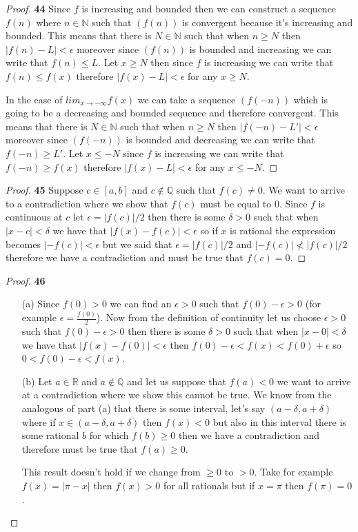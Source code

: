 \documentclass[11pt]{article}
\newcommand{\N}{\mathbb{N}}
\newcommand{\Q}{\mathbb{Q}}
\newcommand{\R}{\mathbb{R}}
\theoremstyle{definition}
\begin{document}
\cleardoublepage
    \begin{proof}{\textbf{44}}
        Since $f$ is increasing and bounded then we can construct a sequence $f(n)$
        where $n \in \N$  such that $(f(n))$ is convergent because it's increasing and
        bounded. This means that there is $N \in \N$ such that when $n \geq N$ then
        $|f(n)-L|<\epsilon$ moreover since $(f(n))$ is bounded and increasing we can
        write that $f(n)\leq L$. Let $x\geq N$ then since $f$ is increasing we can write
        that $f(n) \leq f(x)$ therefore $|f(x)-L|<\epsilon$ for any $x \geq N$.

        In the case of $lim_{x \to -\infty}f(x)$ we can take a sequence $(f(-n))$ which
        is going to be a decreasing and bounded sequence and therefore convergent.
        This means that there is $N \in \N$ such that when $n \geq N$ then
        $|f(-n)-L'|<\epsilon$ moreover since $(f(-n))$ is bounded and decreasing
        we can write that $f(-n) \geq L'$. Let $x\leq -N$ since $f$ is increasing we
        can write that $f(-n) \geq f(x)$ therefore $|f(x)-L|<\epsilon$ for any
        $x \leq -N$.
    \end{proof}
    \begin{proof}{\textbf{45}}
        Suppose $c \in [a,b]$ and $c \notin \Q$ such that $f(c) \neq 0$. We want to arrive to
        a contradiction where we show that $f(c)$ must be equal to $0$.
        Since $f$ is continuous at $c$ let $\epsilon = |f(c)|/2$ then there is some
        $\delta>0$ such that when  $|x-c|<\delta$ we have that 
        $|f(x) - f(c)|<\epsilon$ so if $x$ is rational the expression becomes
        $|-f(c)|<\epsilon$  but we said that $\epsilon = |f(c)|/2$ and
        $|-f(c)| \nless |f(c)|/2$ therefore we have a contradiction and must be true
        that $f(c) = 0$.
    \end{proof}
    \begin{proof}{\textbf{46}}
    \begin{itemize}
        \item [(a)] Since $f(0)>0$ we can find an $\epsilon>0$ such that
        $f(0)-\epsilon>0$ (for example $\epsilon = \frac{f(0)}{2}$). Now from the
        definition of continuity let us choose $\epsilon>0$ such that $f(0)-\epsilon>0$
        then there is some $\delta>0$ such that when $|x-0|< \delta$ we have that
        $|f(x)-f(0)|<\epsilon$ then $f(0)-\epsilon<f(x)<f(0)+\epsilon$ so
        $0<f(0)-\epsilon<f(x)$.
        \item [(b)] Let $a \in \R$ and $a \notin \Q$ and let us suppose that $f(a)<0$
        we want to arrive at a contradiction where we show this cannot be true.
        We know from the analogous of part (a) that there is some interval, let's say
        $(a-\delta,a+\delta)$ where if $x \in (a-\delta,a+\delta)$ then $f(x)<0$ but
        also in this interval there is some rational $b$ for which $f(b)\geq 0$ then
        we have a contradiction and therefore must be true that $f(a)\geq 0$.
        
        This result doesn't hold if we change from $\geq 0$ to $>0$. Take for example
        $f(x)=|\pi-x|$ then $f(x)>0$ for all rationals but if $x=\pi$ then $f(\pi) = 0$. 
    \end{itemize}
    \end{proof}
\end{document}
